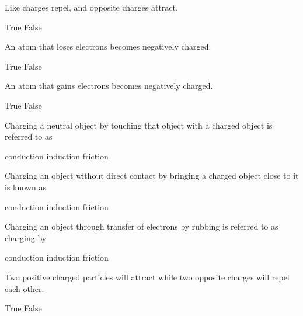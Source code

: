 \documentclass[../main-physics-problems.tex]{subfiles}
\begin{document}
\clearpage
\begin{questions}
\question
Like charges repel, and opposite charges attract.

\begin{randomizechoices}[norandomize]
    \correctchoice True
    \choice False
\end{randomizechoices}

\question
An atom that loses electrons becomes negatively charged.

\begin{randomizechoices}[norandomize]
    \choice True
    \correctchoice False
\end{randomizechoices}

\question
An atom that gains electrons becomes negatively charged.

\begin{randomizechoices}[norandomize]
    \correctchoice True
    \choice False
\end{randomizechoices}

\question
Charging a neutral object by touching that object with a charged object is referred to as

\begin{randomizechoices}
    \correctchoice conduction
    \choice induction
    \choice friction
\end{randomizechoices}

\question
Charging an object without direct contact by bringing a charged object close to it is known as

\begin{randomizechoices}
    \choice conduction
    \correctchoice induction
    \choice friction
\end{randomizechoices}

\question
Charging an object through transfer of electrons by rubbing is referred to as charging by

\begin{randomizechoices}
    \choice conduction
    \choice induction
    \correctchoice friction
\end{randomizechoices}



\question
Two positive charged particles will attract while two opposite charges will repel each other.

\begin{randomizechoices}[norandomize]
    \choice True
    \correctchoice False
\end{randomizechoices}


\end{questions}
\end{document}
